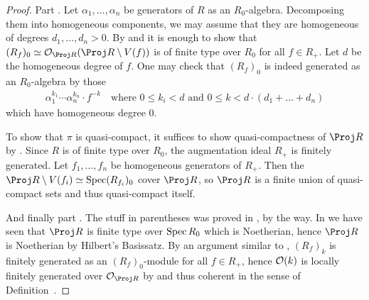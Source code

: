 \documentclass[a4paper,parskip=half,numbers=enddot, DIV=12]{scrreprt}
\begin{document}
\begin{proof}
	Part . Let $\alpha_1,\ldots,\alpha_n$ be generators of $R$ as an $R_0$-algebra. Decomposing them into homogeneous components, we may assume that they are homogeneous of degrees $d_1,\ldots,d_n>0$. By \cite[Proposition~2.2.1]{alggeo1}  and  it is enough to show that $(R_f)_0\simeq\Oo_{\Proj R}(\Proj R\setminus V(f))$ is of finite type over $R_0$ for all $f\in R_+$. Let $d$ be the homogeneous degree of $f$. One may check that $(R_f)_0$ is indeed generated as an $R_0$-algebra by those
	\begin{align*}
	\alpha_1^{k_1}\cdots \alpha_n^{k_n}\cdot f^{-k}\quad\text{where }0\leq k_i<d\text{ and }0\leq k<d\cdot(d_1+\ldots+d_n)
	\end{align*}
	which have homogeneous degree $0$. 
	
	To show that $\pi$ is quasi-compact, it suffices to show quasi-compactness of $\Proj R$ by \cite[Fact~2.1.2]{alggeo1}. Since $R$ is of finite type over $R_0$, the augmentation ideal $R_+$ is finitely generated. Let $f_1,\ldots,f_n$ be homogeneous generators of $R_+$. Then the $\Proj R\setminus V(f_i)\simeq \Spec (R_{f_i})_0$ cover $\Proj R$, so $\Proj R$ is a finite union of quasi-compact sets and thus quasi-compact itself.
	
	And finally part . The stuff in parentheses was proved in \cite[Proposition~2.2.1]{alg2}, by the way. In  we have seen that $\Proj R$ is finite type over $\operatorname{Spec} R_0$ which is Noetherian, hence $\Proj R$ is Noetherian by Hilbert's Basissatz. By an argument similar to , $(R_f)_k$ is finitely generated as an $(R_f)_0$-module for all $f\in R_+$, hence $\mathcal{O}(k)$ is locally finitely generated over $\Oo_{\Proj R}$ by  and thus coherent in the sense of Definition~.
\end{proof}
\end{document}
